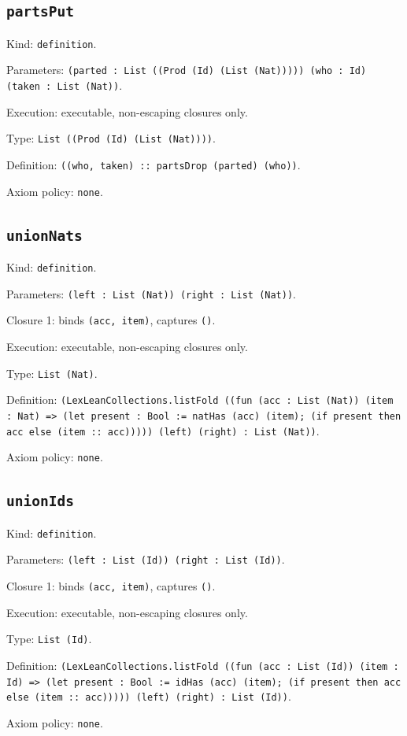 \documentclass[11pt]{article}
\begin{document}
\subsection*{\texttt{partsPut}}
\noindent Kind: \texttt{definition}.\par
\noindent Parameters: \texttt{(parted : List ((Prod (Id) (List (Nat))))) (who : Id) (taken : List (Nat))}.\par
\noindent Execution: executable, non-escaping closures only.\par
\noindent Type: \texttt{List ((Prod (Id) (List (Nat))))}.\par
\noindent Definition: \texttt{((who, taken) :: partsDrop (parted) (who))}.\par
\noindent Axiom policy: \texttt{none}.\par
\subsection*{\texttt{unionNats}}
\noindent Kind: \texttt{definition}.\par
\noindent Parameters: \texttt{(left : List (Nat)) (right : List (Nat))}.\par
\noindent Closure 1: binds \texttt{(acc, item)}, captures \texttt{()}.\par
\noindent Execution: executable, non-escaping closures only.\par
\noindent Type: \texttt{List (Nat)}.\par
\noindent Definition: \texttt{(LexLeanCollections.listFold ((fun (acc : List (Nat)) (item : Nat) => (let present : Bool := natHas (acc) (item); (if present then acc else (item :: acc))))) (left) (right) : List (Nat))}.\par
\noindent Axiom policy: \texttt{none}.\par
\subsection*{\texttt{unionIds}}
\noindent Kind: \texttt{definition}.\par
\noindent Parameters: \texttt{(left : List (Id)) (right : List (Id))}.\par
\noindent Closure 1: binds \texttt{(acc, item)}, captures \texttt{()}.\par
\noindent Execution: executable, non-escaping closures only.\par
\noindent Type: \texttt{List (Id)}.\par
\noindent Definition: \texttt{(LexLeanCollections.listFold ((fun (acc : List (Id)) (item : Id) => (let present : Bool := idHas (acc) (item); (if present then acc else (item :: acc))))) (left) (right) : List (Id))}.\par
\noindent Axiom policy: \texttt{none}.\par
\end{document}

